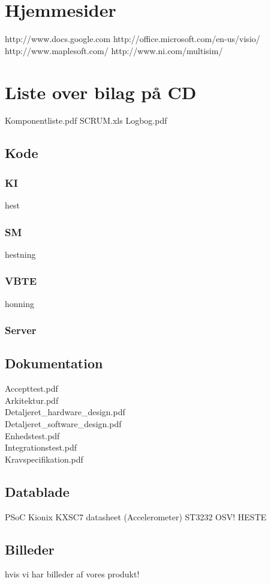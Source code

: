 \section{Hjemmesider}
http://www.docs.google.com
http://office.microsoft.com/en-us/visio/
http://www.maplesoft.com/
http://www.ni.com/multisim/

\section{Liste over bilag på CD}
Komponentliste.pdf
SCRUM.xls
Logbog.pdf
\subsection{Kode}
\subsubsection{KI}
hest
\subsubsection{SM}
hestning
\subsubsection{VBTE}
honning
\subsubsection{Server}
\subsection{Dokumentation}
Accepttest.pdf\\
Arkitektur.pdf\\
Detaljeret\_hardware\_design.pdf\\
Detaljeret\_software\_design.pdf\\
Enhedstest.pdf\\
Integrationstest.pdf\\
Kravspecifikation.pdf\\

\subsection{Datablade}
PSoC
Kionix KXSC7 datasheet (Accelerometer)
ST3232
OSV! HESTE

\subsection{Billeder}
hvis vi har billeder af vores produkt!